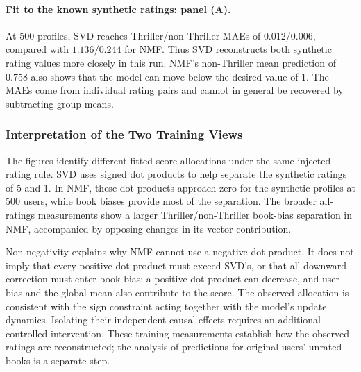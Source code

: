 \paragraph{Fit to the known synthetic ratings: panel (A).}
At 500 profiles, SVD reaches Thriller/non-Thriller MAEs of $0.012/0.006$, compared with $1.136/0.244$ for NMF. Thus SVD reconstructs both synthetic rating values more closely in this run. NMF's non-Thriller mean prediction of 0.758 also shows that the model can move below the desired value of 1. The MAEs come from individual rating pairs and cannot in general be recovered by subtracting group means.

\subsubsection{Interpretation of the Two Training Views}

The figures identify different fitted score allocations under the same injected rating rule. SVD uses signed dot products to help separate the synthetic ratings of 5 and 1. In NMF, these dot products approach zero for the synthetic profiles at 500 users, while book biases provide most of the separation. The broader all-ratings measurements show a larger Thriller/non-Thriller book-bias separation in NMF, accompanied by opposing changes in its vector contribution.

Non-negativity explains why NMF cannot use a negative dot product. It does not imply that every positive dot product must exceed SVD's, or that all downward correction must enter book bias: a positive dot product can decrease, and user bias and the global mean also contribute to the score. The observed allocation is consistent with the sign constraint acting together with the model's update dynamics. Isolating their independent causal effects requires an additional controlled intervention. These training measurements establish how the observed ratings are reconstructed; the analysis of predictions for original users' unrated books is a separate step.


